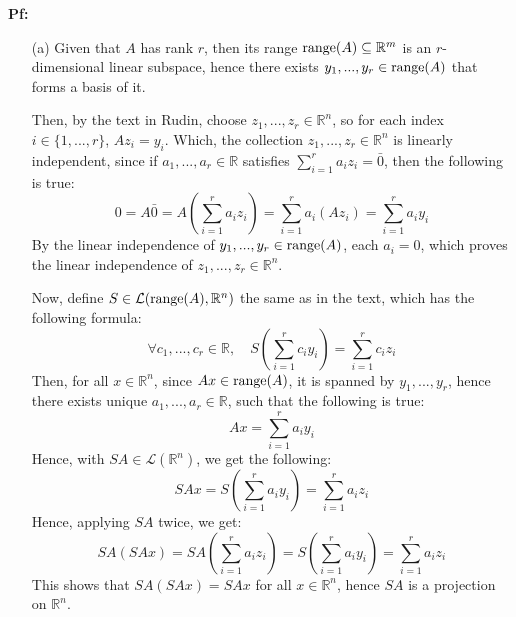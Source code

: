 \documentclass{article}
\begin{document}
\textbf{Pf:}
\begin{itemize}
    \item[(a)] Given that $A$ has rank $r$, then its range $\textmd{range}(A)\subseteq \mathbb{R}^m$ is an $r$-dimensional linear subspace, hence there exists $y_1,...,y_r\in \textmd{range}(A)$ that forms a basis of it.
    
    Then, by the text in Rudin, choose $z_1,...,z_r\in\mathbb{R}^n$, so for each index $i\in \{1,...,r\}$, $Az_i=y_i$. Which, the collection $z_1,...,z_r\in\mathbb{R}^n$ is linearly independent, since if $a_1,...,a_r\in\mathbb{R}$ satisfies $\sum_{i=1}^{r}a_iz_i = \bar{0}$, then the following is true:
    $$0=A\bar{0}=A\left(\sum_{i=1}^{r}a_iz_i\right) = \sum_{i=1}^{r}a_i(Az_i) = \sum_{i=1}^{r}a_iy_i$$
    By the linear independence of $y_1,...,y_r\in \textmd{range}(A)$, each $a_i = 0$, which proves the linear independence of $z_1,...,z_r\in\mathbb{R}^n$.

    \begin{comment}
    Now, we can expand the linearly independent list $z_1,...,z_r\in\mathbb{R}^n$ into a basis, say $z_1,...,z_r,x_1,...,x_k\in\mathbb{R}^n$ with $r+k=n$.
    Which, each $x_j$ with $j\in\{1,...,k\}$ must satisfy $Ax_j = \bar{0}\in\mathbb{R}^m$ (or $x_j\in \textmd{null}(A)\subseteq\mathbb{R}^n$): Since $Ax_j\in\textmd{range}(A)$, then it is spanned by $y_1,...,y_r$, there exists $a_1,...,a_r\in\mathbb{R}$ such that the following equation is true:
    $$Ax_j = \sum_{i=1}^{r}a_iy_i$$
    By the definition of $z_i$ given above, $Ax_j$ can then be rewrite as:
    $$Ax_j = \sum_{i=1}^{r}a_iy_i = \sum_{i=1}^{r}a_i(Az_i) = A\left(\sum_{i=1}^{r}a_iz_i\right)$$
    \end{comment}

    Now, define $S\in\mathcal{L}(\textmd{range}(A),\mathbb{R}^n)$ the same as in the text, which has the following formula:
    $$\forall c_1,...,c_r\in\mathbb{R},\quad S\left(\sum_{i=1}^{r}c_iy_i\right)=\sum_{i=1}^{r}c_iz_i$$
    Then, for all $x\in\mathbb{R}^n$, since $Ax\in\textmd{range}(A)$, it is spanned by $y_1,...,y_r$, hence there exists unique $a_1,...,a_r\in\mathbb{R}$, such that the following is true:
    $$Ax = \sum_{i=1}^{r}a_iy_i$$
    Hence, with $SA\in\mathcal{L}(\mathbb{R}^n)$, we get the following:
    $$SAx = S\left(\sum_{i=1}^{r}a_iy_i\right) = \sum_{i=1}^{r}a_iz_i$$
    Hence, applying $SA$ twice, we get:
    $$SA(SAx) = SA\left(\sum_{i=1}^{r}a_iz_i\right) = S\left(\sum_{i=1}^{r}a_iy_i\right) = \sum_{i=1}^{r}a_iz_i$$
    This shows that $SA(SAx) = SAx$ for all $x\in\mathbb{R}^n$, hence $SA$ is a projection on $\mathbb{R}^n$.


\end{itemize}
\end{document}
